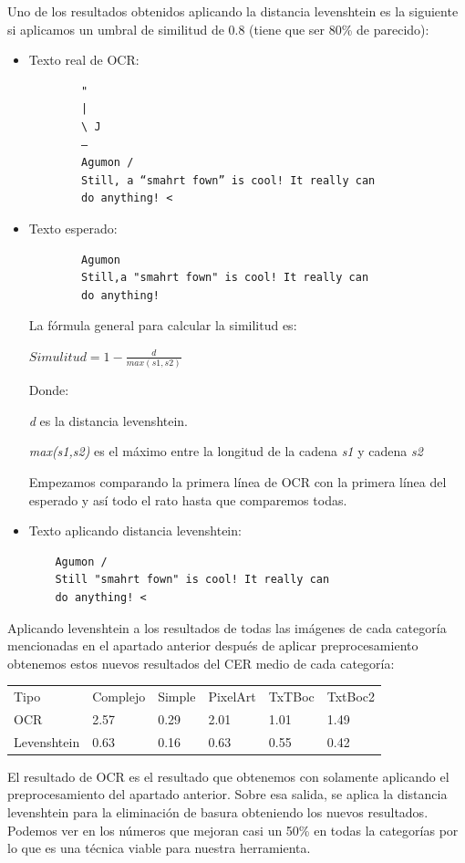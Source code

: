 Uno de los resultados obtenidos aplicando la distancia levenshtein es la siguiente si aplicamos un umbral de similitud de 0.8 (tiene que ser 80\% de parecido):
\begin{itemize}
		\item Texto real de OCR:
	\begin{verbatim}
		"
		|
		\ J
		—
		Agumon /
		Still, a “smahrt fown” is cool! It really can
		do anything! <
	\end{verbatim}
	\item Texto esperado:
	\begin{verbatim}
		Agumon
		Still,a "smahrt fown" is cool! It really can
		do anything!
	\end{verbatim}
	La fórmula general para calcular la similitud es:
	
	$Simulitud = 1-\frac{d}{max(s1,s2)} $ 
	
	Donde:
	
	\textit{d} es la distancia levenshtein.
	
	\textit{max(s1,s2)}	 es el máximo entre la longitud de la cadena \textit{s1} y cadena \textit{s2}
	
	Empezamos comparando la primera línea de OCR con la primera línea del esperado y así todo el rato hasta que comparemos todas.
	
	\item Texto aplicando distancia levenshtein:
	\begin{verbatim}
	Agumon /
	Still "smahrt fown" is cool! It really can 
	do anything! <
	\end{verbatim}
\end{itemize}  
Aplicando levenshtein a los resultados de todas las imágenes de cada categoría mencionadas en el apartado anterior después de aplicar preprocesamiento obtenemos estos nuevos resultados del CER medio de cada categoría:

\begin{table}[H]
	\begin{tabular}{llllll}
		Tipo        & Complejo & Simple & PixelArt & TxTBoc & TxtBoc2                      \\
		OCR         & 2.57     & 0.29   & 2.01     & 1.01   & \cellcolor[HTML]{FFFFFF}1.49 \\
		Levenshtein & 0.63     & 0.16   & 0.63     & 0.55   & 0.42                        
	\end{tabular}
\end{table}
El resultado de OCR es el resultado que obtenemos con solamente aplicando el preprocesamiento del apartado anterior. Sobre esa salida, se aplica la distancia levenshtein para la eliminación de basura obteniendo los nuevos resultados. Podemos ver en los números que mejoran casi un 50\% en todas la categorías por lo que es una técnica viable para nuestra herramienta.

 

